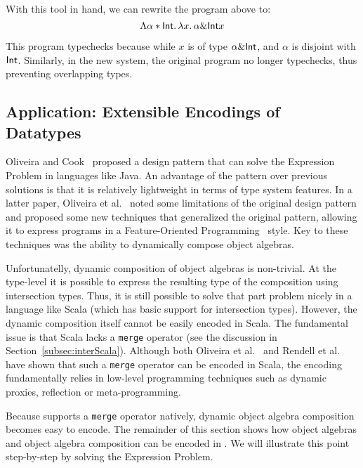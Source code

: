 With this tool in hand, we can rewrite the program above to:
\[
\Lambda \alpha * \textsf{Int}.\, \lambda x.\, \alpha \& \textsf{Int} x
\]

This program typechecks because while $x$ is of type $\alpha \& \textsf{Int}$,
and $\alpha$ is disjoint with $\textsf{Int}$. Similarly, in the new system,
the original program no longer typechecks, thus preventing overlapping types.

\subsection{Application: Extensible Encodings of Datatypes}
\label{subsec:OAs}

Oliveira and Cook~\cite{oliveira2012extensibility} proposed a design pattern that can solve the
Expression Problem in languages like Java. An advantage of the pattern
over previous solutions is that it is relatively lightweight in terms
of type system features. In a latter paper, Oliveira et al.~\cite{oliveira2013feature}
noted some limitations of the original design pattern and proposed 
some new techniques that generalized the original pattern, allowing it 
to express programs in a Feature-Oriented Programming~\cite{Prehofer97} style.
Key to these techniques was the ability to dynamically compose object
algebras.

Unfortunatelly, dynamic composition of object algebras is
non-trivial. At the type-level it is possible to express the resulting
type of the composition using intersection types. Thus, it is still
possible to solve that part problem nicely in a language like Scala (which
has basic support for intersection types). However, the dynamic
composition itself cannot be easily encoded in Scala. The fundamental 
issue is that Scala lacks a \lstinline{merge} operator (see the
discussion in Section~\ref{subsec:interScala}). Although both Oliveira et al.~\cite{oliveira2013feature} and
Rendell et al.~\cite{rendel14attributes} have shown that such a \lstinline{merge} operator can
be encoded in Scala, the encoding fundamentally relies in low-level
programming techniques such as dynamic proxies, reflection or
meta-programming. 

Because \name supports a \lstinline{merge} operator natively, dynamic
object algebra composition becomes easy to encode. The remainder of
this section shows how object algebras and object algebra composition
can be encoded in \name. We will illustrate this point 
step-by-step by solving the Expression Problem. 
 
